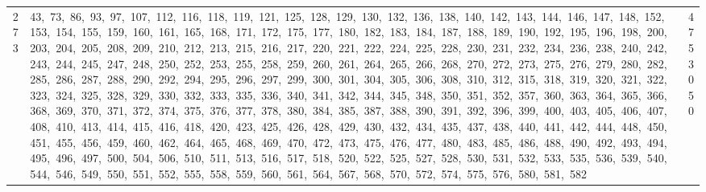 \begin{longtable}{c|p{}|r}
273 & 43,\ 73,\ 86,\ 93,\ 97,\ 107,\ 112,\ 116,\ 118,\ 119,\ 121,\ 125,\ 128,\ 129,\ 130,\ 132,\ 136,\ 138,\ 140,\ 142,\ 143,\ 144,\ 146,\ 147,\ 148,\ 152,\ 153,\ 154,\ 155,\ 159,\ 160,\ 161,\ 165,\ 168,\ 171,\ 172,\ 175,\ 177,\ 180,\ 182,\ 183,\ 184,\ 187,\ 188,\ 189,\ 190,\ 192,\ 195,\ 196,\ 198,\ 200,\ 203,\ 204,\ 205,\ 208,\ 209,\ 210,\ 212,\ 213,\ 215,\ 216,\ 217,\ 220,\ 221,\ 222,\ 224,\ 225,\ 228,\ 230,\ 231,\ 232,\ 234,\ 236,\ 238,\ 240,\ 242,\ 243,\ 244,\ 245,\ 247,\ 248,\ 250,\ 252,\ 253,\ 255,\ 258,\ 259,\ 260,\ 261,\ 264,\ 265,\ 266,\ 268,\ 270,\ 272,\ 273,\ 275,\ 276,\ 279,\ 280,\ 282,\ 285,\ 286,\ 287,\ 288,\ 290,\ 292,\ 294,\ 295,\ 296,\ 297,\ 299,\ 300,\ 301,\ 304,\ 305,\ 306,\ 308,\ 310,\ 312,\ 315,\ 318,\ 319,\ 320,\ 321,\ 322,\ 323,\ 324,\ 325,\ 328,\ 329,\ 330,\ 332,\ 333,\ 335,\ 336,\ 340,\ 341,\ 342,\ 344,\ 345,\ 348,\ 350,\ 351,\ 352,\ 357,\ 360,\ 363,\ 364,\ 365,\ 366,\ 368,\ 369,\ 370,\ 371,\ 372,\ 374,\ 375,\ 376,\ 377,\ 378,\ 380,\ 384,\ 385,\ 387,\ 388,\ 390,\ 391,\ 392,\ 396,\ 399,\ 400,\ 403,\ 405,\ 406,\ 407,\ 408,\ 410,\ 413,\ 414,\ 415,\ 416,\ 418,\ 420,\ 423,\ 425,\ 426,\ 428,\ 429,\ 430,\ 432,\ 434,\ 435,\ 437,\ 438,\ 440,\ 441,\ 442,\ 444,\ 448,\ 450,\ 451,\ 455,\ 456,\ 459,\ 460,\ 462,\ 464,\ 465,\ 468,\ 469,\ 470,\ 472,\ 473,\ 475,\ 476,\ 477,\ 480,\ 483,\ 485,\ 486,\ 488,\ 490,\ 492,\ 493,\ 494,\ 495,\ 496,\ 497,\ 500,\ 504,\ 506,\ 510,\ 511,\ 513,\ 516,\ 517,\ 518,\ 520,\ 522,\ 525,\ 527,\ 528,\ 530,\ 531,\ 532,\ 533,\ 535,\ 536,\ 539,\ 540,\ 544,\ 546,\ 549,\ 550,\ 551,\ 552,\ 555,\ 558,\ 559,\ 560,\ 561,\ 564,\ 567,\ 568,\ 570,\ 572,\ 574,\ 575,\ 576,\ 580,\ 581,\ 582 & 4753050 \\

\end{longtable}
